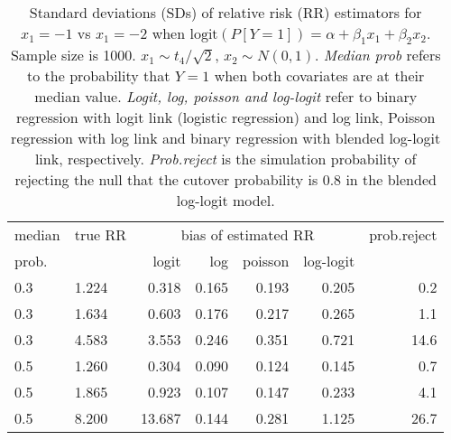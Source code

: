 \documentclass[12pt,a4paper]{article}
\begin{document}
\begin{table}[H] 
\small\sf\centering 
\caption{Standard deviations (SDs) of relative risk (RR) estimators for $x_1=-1$ vs $x_1=-2$ when $\mbox{logit}(P[Y=1])=\alpha+\beta_1 x_1 + \beta_2 x_2$. Sample size is 1000. $x_1 \sim $$t_4/\sqrt{2}$, $x_2 \sim N(0,1)$. {\it Median prob} refers to the probability that $Y=1$ when both covariates are at their median value. {\it Logit, log, poisson and log-logit} refer to binary regression with logit link (logistic regression) and log link, Poisson regression with log link and binary regression with blended log-logit link, respectively. {\it Prob.reject} is the simulation probability of rejecting the null that the cutover probability is $0.8$ in the blended log-logit model.} 
\begin{tabular}{llrrrrr} 
\toprule 
median & true RR & \multicolumn{4}{c}{bias of estimated RR} & prob.reject \\ 
prob. & & logit & log & poisson & log-logit  & \\ \midrule 
0.3 & 1.224 &  0.318 & 0.165 & 0.193 & 0.205 &  0.2 \\  
0.3 & 1.634 &  0.603 & 0.176 & 0.217 & 0.265 &  1.1 \\  
0.3 & 4.583 &  3.553 & 0.246 & 0.351 & 0.721 & 14.6 \\  
0.5 & 1.260 &  0.304 & 0.090 & 0.124 & 0.145 &  0.7 \\  
0.5 & 1.865 &  0.923 & 0.107 & 0.147 & 0.233 &  4.1 \\  
0.5 & 8.200 & 13.687 & 0.144 & 0.281 & 1.125 & 26.7 \\  
\bottomrule 
\end{tabular} 
\end{table} 
\end{document}
